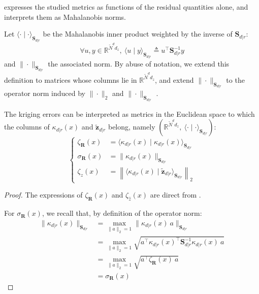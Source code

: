  expresses the studied metrics as functions of the residual quantities alone, and  interprets them as Mahalanobis norms.

\begin{proposition}\label{th:errors_euclidean}
	Let $\langle\cdot\mid\cdot\rangle_{\mathbf{S}_{d|r}}$ be the Mahalanobis inner product weighted by the inverse of $\mathbf{S}_{d|r}$:
	\begin{equation}
		\forall u,y\in\mathbb{R}^{\tilde{N}^dd_z},\:\langle u\mid y\rangle_{\mathbf{S}_{d|r}}\triangleq u^\top \mathbf{S}_{d|r}^{-1}y
	\end{equation}
	and $\|\cdot\|_{\mathbf{S}_{d|r}}$ the associated norm. By abuse of notation, we extend this definition to matrices whose columns lie in $\mathbb{R}^{\tilde{N}^dd_z}$, and extend $\|\cdot\|_{\mathbf{S}_{d|r}}$ to the operator norm induced by $\|\cdot\|_2$ and $\|\cdot\|_{\mathbf{S}_{d|r}}$ \cite{bib:matrix-norms}.

	The kriging errors can be interpreted as metrics in the Euclidean space to which the columns of $\kappa_{d|r}(x)$ and $\tilde{\mathbf{z}}_{d|r}$ belong, namely $(\mathbb{R}^{\tilde{N}^dd_z},\:\langle\cdot\mid\cdot\rangle_{\mathbf{S}_{d|r}})$:
	\begin{equation}
		\left\{\begin{aligned}
		\zeta_{\mathbf{R}}(x)&=\langle \kappa_{d|r}(x)\mid\kappa_{d|r}(x)\rangle_{\mathbf{S}_{d|r}}\\
		\sigma_{\mathbf{R}}(x)&=\|\kappa_{d|r}(x)\|_{\mathbf{S}_{d|r}}\\
		\zeta_{\hat{z}}(x)&=\left\|\langle \kappa_{d|r}(x)\mid\tilde{\mathbf{z}}_{d|r}\rangle_{\mathbf{S}_{d|r}}\right\|_2
		\end{aligned}\right.
	\end{equation}
\end{proposition}

\begin{proof}
	The expressions of $\zeta_{\mathbf{R}}(x)$ and $\zeta_{\hat{z}}(x)$ are direct from .

	For $\sigma_{\mathbf{R}}(x)$, we recall that, by definition of the operator norm:
	\begin{equation}
		\begin{aligned}
		\|\kappa_{d|r}(x)\|_{\mathbf{S}_{d|r}}&=\max_{\|a\|_2=1}\|\kappa_{d|r}(x)\:a\|_{\mathbf{S}_{d|r}}\\
		&=\max_{\|a\|_2=1}\sqrt{a^\top \kappa_{d|r}(x)^\top \mathbf{S}_{d|r}^{-1}\kappa_{d|r}(x)\:a}\\
		&=\max_{\|a\|_2=1}\sqrt{a^\top \zeta_{\mathbf{R}}(x)\:a}\\
		&=\sigma_{\mathbf{R}}(x)
		\end{aligned}
	\end{equation}
\end{proof}


